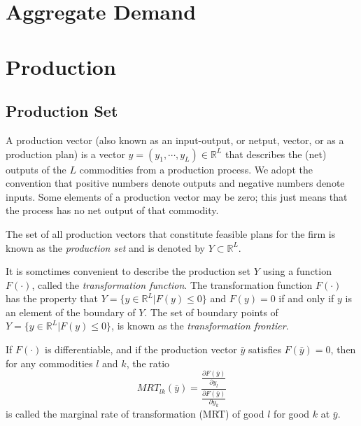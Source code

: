\documentclass[12pt,fleqn]{book} %
\begin{document}
\chapter{Aggregate Demand}

\chapter{Production}

\section{Production Set}
A production vector (also known as an input-output, or netput, vector, or as a production plan) is a vector $y = (y_1,\cdots ,y_L)\in\mathbb{R}^L$ that describes the (net) outputs of the $L$ commodities from a production process. We adopt the convention that positive numbers denote outputs and negative numbers denote inputs. Some elements of a production vector may be zero; this just means that the process has no net output of that commodity.

\begin{definition}
	The set of all production vectors that constitute feasible plans for the firm is known as the \emph{production set} and is denoted
	by $Y\subset \mathbb{R}^L$.
\end{definition}


\begin{definition}
It is somctimes convenient to describe the production set $Y$ using a function $F(\cdot)$, called the \emph{transformation function}. The transformation function $F(\cdot)$ has the property
that $Y = \{y\in\mathbb{R}^L|F(y)\le 0\} $ and $F(y) = 0$ if and only if $y$ is an element of the boundary of $Y$. The set of boundary points of $Y = \{y\in\mathbb{R}^L|F(y)\le 0\}$, is known as the \emph{transformation frontier}.
\end{definition}

	
\begin{definition}
	If $F(\cdot)$ is differentiable, and if the production vector $\bar{y}$ satisfies $F(\bar{y}) = 0$, then for any commodities $l$ and $k$, the ratio 
	\[
	MRT_{lk}(\bar{y})=\frac{\frac{\partial F(\bar{y})}{\partial y_l}}{\frac{\partial F(\bar{y})}{\partial y_k}}
	\]
	is called the marginal rate of transformation (MRT) of good $l$ for good $k$ at $\bar{y}$.
\end{definition}	
	
\end{document}
